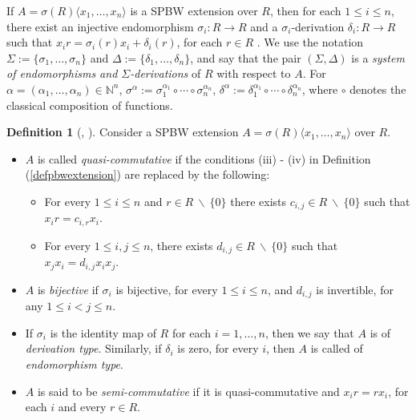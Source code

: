 \documentclass{amsart}
\theoremstyle{definition}
\newtheorem{definition}[theorem]{Definition}
\theoremstyle{remark}
\numberwithin{equation}{section}
\begin{document}
If $A = \sigma(R)\langle x_1,\dotsc, x_n\rangle$ is a SPBW extension over $R$, then for each $1 \leq i \leq n$, there exist an injective endomorphism $\sigma_i : R \to R$ and a $\sigma_i$-derivation $\delta_i: R \to R$ such that $x_ir = \sigma_i(r)x_i + \delta_i(r)$, for each $r\in R$ \cite[Proposition 3]{GallegoLezama2010}. We use the notation $\Sigma:=\{\sigma_1,\dots,\sigma_n\}$ and $\Delta:=\{\delta_1,\dots,\delta_n\}$, and say that the pair $(\Sigma, \Delta)$ is a \textit{system of endomorphisms and $\Sigma$-derivations} of $R$ with respect to $A$. For $\alpha = (\alpha_1, \dots , \alpha_n) \in \mathbb{N}^n$, $\sigma^{\alpha}:= \sigma_1^{\alpha_1}\circ \cdots \circ \sigma_n^{\alpha_n}$, $\delta^{\alpha} := \delta_1^{\alpha_1} \circ \cdots \circ \delta_n^{\alpha_n}$, where $\circ$ denotes the classical composition of functions. 

\begin{definition}[{\cite[Definition 4]{GallegoLezama2010}}, {\cite[Definition 2.3 (ii)]{LezamaAcostaReyes2015}}]\label{quasicommutativebijective}
Consider a SPBW extension $A = \sigma(R)\langle x_1,\dotsc, x_n\rangle$ over $R$.
\begin{itemize}
\item [(i)] $A$ is called {\em quasi-commutative} if the conditions (iii) - (iv) in Definition (\ref{defpbwextension}) are replaced by the following:
\begin{itemize}
\item For every $1 \leq i \leq n$ and $r \in R \ \backslash\ \{0\}$ there exists $c_{i,j} \in R\ \backslash\ \{0\}$ such that $x_ir = c_{i,r}x_i$.
        
\item For every $1 \leq i,j \leq n$, there exists $d_{i,j} \in R\ \backslash\ \{0\}$ such that $x_jx_i = d_{i,j}x_ix_j$.
\end{itemize}
    
\item [(ii)] $A$ is {\it bijective} if $\sigma_i$ is bijective, for every $1 \leq i \leq n$, and $d_{i,j}$ is invertible, for any $1 \leq i < j \leq n$.
    
\item [(iii)] If $\sigma_i$ is the identity map of $R$ for each $i = 1, \dotsc, n$, then we say that $A$ is of {\em derivation type}. Similarly, if $\delta_i$ is zero, for every $i$, then $A$ is called of {\em endomorphism type}.
\item [(iv)] $A$ is said to be {\em semi-commutative} if it is quasi-commutative and $x_ir = rx_i$, for each $i$ and every $r\in R$.
\end{itemize}
\end{definition}
\end{document}
